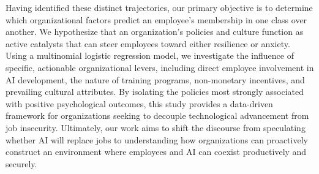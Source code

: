 \documentclass[]{article}
\begin{document}
Having identified these distinct trajectories, our primary objective is to determine which organizational factors predict an employee's membership in one class over another. We hypothesize that an organization's policies and culture function as active catalysts that can steer employees toward either resilience or anxiety. Using a multinomial logistic regression model, we investigate the influence of specific, actionable organizational levers, including direct employee involvement in AI development, the nature of training programs, non-monetary incentives, and prevailing cultural attributes. By isolating the policies most strongly associated with positive psychological outcomes, this study provides a data-driven framework for organizations seeking to decouple technological advancement from job insecurity. Ultimately, our work aims to shift the discourse from speculating whether AI will replace jobs to understanding how organizations can proactively construct an environment where employees and AI can coexist productively and securely.
\end{document}
